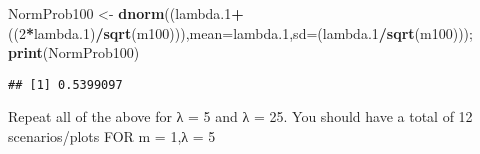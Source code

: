 \documentclass[
]{article}
\newenvironment{Shaded}{\begin{snugshade}}{\end{snugshade}}
\newcommand{\DataTypeTok}[1]{\textcolor[rgb]{0.13,0.29,0.53}{#1}}
\newcommand{\DecValTok}[1]{\textcolor[rgb]{0.00,0.00,0.81}{#1}}
\newcommand{\FloatTok}[1]{\textcolor[rgb]{0.00,0.00,0.81}{#1}}
\newcommand{\KeywordTok}[1]{\textcolor[rgb]{0.13,0.29,0.53}{\textbf{#1}}}
\newcommand{\NormalTok}[1]{#1}
\newcommand{\OperatorTok}[1]{\textcolor[rgb]{0.81,0.36,0.00}{\textbf{#1}}}
\newcommand{\StringTok}[1]{\textcolor[rgb]{0.31,0.60,0.02}{#1}}
\begin{document}
\begin{Shaded}
\begin{Highlighting}[]
\NormalTok{NormProb100 <-}\StringTok{ }\KeywordTok{dnorm}\NormalTok{((lambda}\FloatTok{.1}\OperatorTok{+}\NormalTok{((}\DecValTok{2}\OperatorTok{*}\NormalTok{lambda}\FloatTok{.1}\NormalTok{)}\OperatorTok{/}\KeywordTok{sqrt}\NormalTok{(m100))),}\DataTypeTok{mean=}\NormalTok{lambda}\FloatTok{.1}\NormalTok{,}\DataTypeTok{sd=}\NormalTok{(lambda}\FloatTok{.1}\OperatorTok{/}\KeywordTok{sqrt}\NormalTok{(m100))); }\KeywordTok{print}\NormalTok{(NormProb100)}
\end{Highlighting}
\end{Shaded}

\begin{verbatim}
## [1] 0.5399097
\end{verbatim}

Repeat all of the above for λ = 5 and λ = 25. You should have a total of
12 scenarios/plots FOR m = 1,λ = 5
\end{document}
